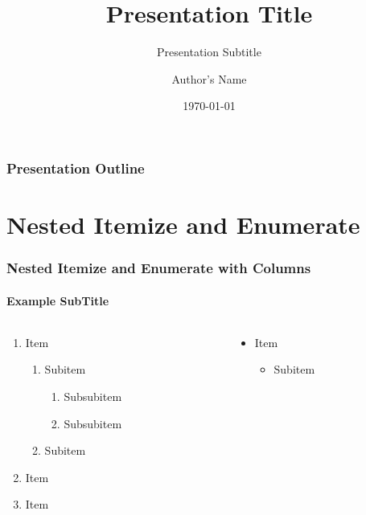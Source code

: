 \documentclass[t, 12pt, aspectratio=169]{beamer}
\title{Presentation Title}
\subtitle{Presentation Subtitle}
\author{Author's Name}
\date{\today}
\begin{document}
\begin{frame}[titleframe]\maketitle\end{frame}

\begin{frame}\frametitle{Presentation Outline}\tableofcontents\vfill\end{frame}

\section{Nested Itemize and Enumerate}

    \begin{frame}
        \frametitle{Nested Itemize and Enumerate with Columns}
        \framesubtitle{Example SubTitle}
        \begin{columns}
            \begin{column}{0.5\linewidth}
                \begin{enumerate}
                    \item Item
                    \begin{enumerate}
                        \item Subitem
                        \begin{enumerate}
                            \item Subsubitem
                            \item Subsubitem
                        \end{enumerate}
                        \item Subitem
                    \end{enumerate}
                    \item Item
                    \item Item
                \end{enumerate}
            \end{column}
            \begin{column}{0.5\linewidth}
                \begin{itemize}
                    \item Item
                    \begin{itemize}
                        \item Subitem
                        \begin{itemize}

\end{itemize}
\end{itemize}
\end{itemize}
\end{column}
\end{columns}
\end{frame}
\end{document}

